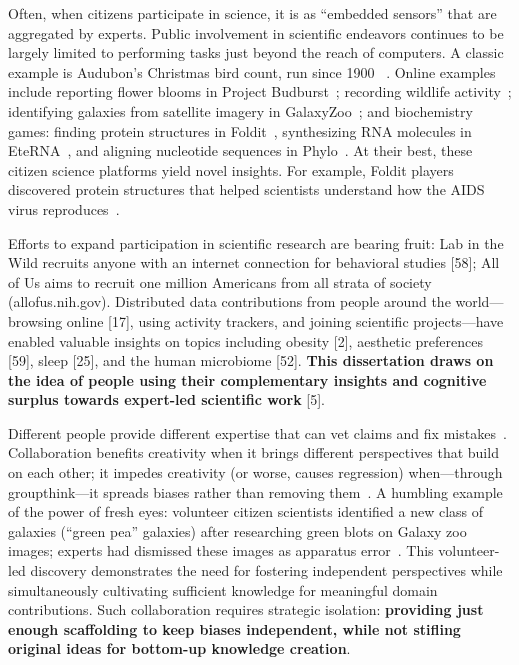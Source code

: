 Often, when citizens participate in science, it is as “embedded sensors” that 
are aggregated by experts. Public involvement in scientific endeavors continues
to be largely limited to performing tasks just beyond the reach of computers.
A classic example is Audubon’s Christmas bird count, run since 1900
~\cite{Audubon2016}. Online examples include reporting flower blooms in
Project Budburst~\cite{BoulderColorado2016}; recording wildlife activity~\cite{Faridani2009a};
identifying galaxies from satellite imagery in GalaxyZoo~\cite{Zooniverse2007}; 
and biochemistry games: finding protein structures in Foldit~\cite{Cooper2010}, 
synthesizing RNA molecules in EteRNA~\cite{Lee2014}, and aligning 
nucleotide sequences in Phylo~\cite{Kawrykow2012}. At their
best, these citizen science platforms yield novel insights.
For example, Foldit players discovered protein structures
that helped scientists understand how the AIDS virus reproduces~\cite{Coren2011}.

Efforts to expand participation in scientific research are bearing fruit: Lab in the Wild 
recruits anyone with an internet connection for behavioral studies [58]; All of Us aims 
to recruit one million Americans from all strata of society (allofus.nih.gov). Distributed 
data contributions from people around the world—browsing online [17], using activity 
trackers, and joining scientific projects—have enabled valuable insights on topics including 
obesity [2], aesthetic preferences [59], sleep [25], and the human microbiome [52]. \textbf{This dissertation 
draws on the idea of people using their complementary insights and cognitive surplus towards 
expert-led scientific work} [5].

Different people provide different expertise that can vet claims and 
fix mistakes~\cite{kane2009s}. Collaboration benefits creativity when it brings different
 perspectives that build on each other; it impedes creativity (or worse, causes regression) 
when—through groupthink—it spreads biases rather than removing them~\cite{starbird2014rumors}. 
A humbling example of the power of fresh eyes: volunteer citizen scientists identified a new class of 
galaxies (“green pea” galaxies) after researching green blots on Galaxy zoo images; 
experts had dismissed these images as apparatus error~\cite{cardamone2009galaxy}.
This volunteer-led discovery demonstrates the need for fostering independent perspectives 
while simultaneously cultivating sufficient knowledge for meaningful domain contributions. 
Such collaboration requires strategic isolation: \textbf {providing just enough scaffolding to keep 
biases independent, while not stifling original ideas for bottom-up knowledge creation}.

